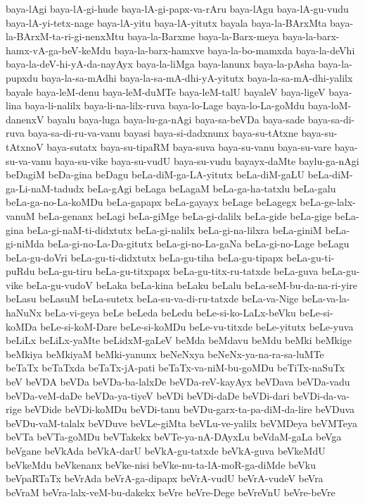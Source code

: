 {baya-lAgi
baya-lA-gi-hude
baya-lA-gi-papx-va-rAru
baya-lAgu
baya-lA-gu-vudu
baya-lA-yi-tetx-nage
baya-lA-yitu
baya-lA-yitutx
bayala
baya-la-BArxMta
baya-la-BArxM-ta-ri-gi-nenxMtu
baya-la-Barxme
baya-la-Barx-meya
baya-la-barx-hamx-vA-ga-beV-keMdu
baya-la-barx-hamxve
baya-la-bo-mamxda
baya-la-deVhi
baya-la-deV-hi-yA-da-nayAyx
baya-la-liMga
baya-lanunx
baya-la-pAsha
baya-la-pupxdu
baya-la-sa-mAdhi
baya-la-sa-mA-dhi-yA-yitutx
baya-la-sa-mA-dhi-yalilx
bayale
baya-leM-denu
baya-leM-duMTe
baya-leM-talU
bayaleV
baya-ligeV
baya-lina
baya-li-nalilx
baya-li-na-lilx-ruva
baya-lo-Lage
baya-lo-La-goMdu
baya-loM-danenxV
bayalu
baya-luga
baya-lu-ga-nAgi
baya-sa-beVDa
baya-sade
baya-sa-di-ruva
baya-sa-di-ru-va-vanu
bayasi
baya-si-dadxnunx
baya-su-tAtxne
baya-su-tAtxnoV
baya-sutatx
baya-su-tipaRM
baya-suva
baya-su-vanu
baya-su-vare
baya-su-va-vanu
baya-su-vike
baya-su-vudU
baya-su-vudu
bayayx-daMte
baylu-ga-nAgi
beDagiM
beDa-gina
beDagu
beLa-diM-ga-LA-yitutx
beLa-diM-gaLU
beLa-diM-ga-Li-naM-tadudx
beLa-gAgi
beLaga
beLagaM
beLa-ga-ha-tatxlu
beLa-galu
beLa-ga-no-La-koMDu
beLa-gapapx
beLa-gayayx
beLage
beLagegx
beLa-ge-lalx-vanuM
beLa-genanx
beLagi
beLa-giMge
beLa-gi-dalilx
beLa-gide
beLa-gige
beLa-gina
beLa-gi-naM-ti-didxtutx
beLa-gi-nalilx
beLa-gi-na-lilxra
beLa-giniM
beLa-gi-niMda
beLa-gi-no-La-Da-gitutx
beLa-gi-no-La-gaNa
beLa-gi-no-Lage
beLagu
beLa-gu-doVri
beLa-gu-ti-didxtutx
beLa-gu-tiha
beLa-gu-tipapx
beLa-gu-ti-puRdu
beLa-gu-tiru
beLa-gu-titxpapx
beLa-gu-titx-ru-tatxde
beLa-guva
beLa-gu-vike
beLa-gu-vudoV
beLaka
beLa-kina
beLaku
beLalu
beLa-seM-bu-da-na-ri-yire
beLasu
beLasuM
beLa-sutetx
beLa-su-va-di-ru-tatxde
beLa-va-Nige
beLa-va-la-haNuNx
beLa-vi-geya
beLe
beLeda
beLedu
beLe-si-ko-LaLx-beVku
beLe-si-koMDa
beLe-si-koM-Dare
beLe-si-koMDu
beLe-vu-titxde
beLe-yitutx
beLe-yuva
beLiLx
beLiLx-yaMte
beLidxM-gaLeV
beMda
beMdavu
beMdu
beMki
beMkige
beMkiya
beMkiyaM
beMki-yanunx
beNeNxya
beNeNx-ya-na-ra-sa-luMTe
beTaTx
beTaTxda
beTaTx-jA-pati
beTaTx-va-niM-bu-goMDu
beTiTx-naSuTx
beV
beVDA
beVDa
beVDa-ba-lalxDe
beVDa-reV-kayAyx
beVDava
beVDa-vadu
beVDa-veM-daDe
beVDa-ya-tiyeV
beVDi
beVDi-daDe
beVDi-dari
beVDi-da-va-rige
beVDide
beVDi-koMDu
beVDi-tanu
beVDu-garx-ta-pa-diM-da-lire
beVDuva
beVDu-vaM-talalx
beVDuve
beVLe-giMta
beVLu-ve-yalilx
beVMDeya
beVMTeya
beVTa
beVTa-goMDu
beVTakekx
beVTe-ya-nA-DAyxLu
beVdaM-gaLa
beVga
beVgane
beVkAda
beVkA-darU
beVkA-gu-tatxde
beVkA-guva
beVkeMdU
beVkeMdu
beVkenanx
beVke-nisi
beVke-nu-ta-lA-moR-ga-diMde
beVku
beVpaRTaTx
beVrAda
beVrA-ga-dipapx
beVrA-vudU
beVrA-vudeV
beVra
beVraM
beVra-lalx-veM-bu-dakekx
beVre
beVre-Dege
beVreVnU
beVre-beVre
}
